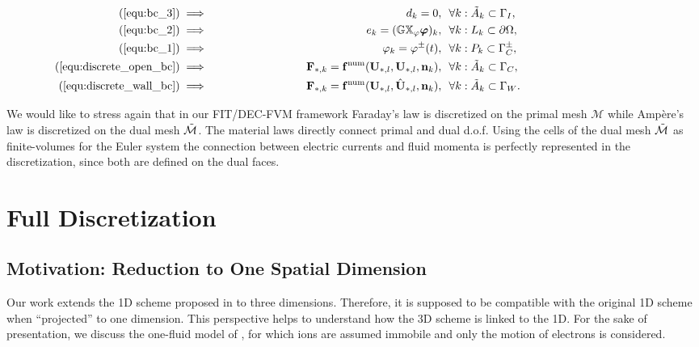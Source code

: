 \documentclass{article}
\begin{document}
\begin{subequations}
    \begin{align}
    (\ref{equ:bc_3}) & \implies \;\;\;\;\;\;\;\;\;\;\;\;\;\;\;\;\;\;\;\;\;\;\;\;\;\;\;\;& d_k = 0,\ \ &\forall k : \Tilde{A}_k \subset \Gamma_I,\;\;\;\;\;\;\;\;\;\;\;\;\;\;\;\;\;\;\;\;\;\;\;\;\;\;\;\;\;\;\;\;\;\;\;\;\;\;\;\;\;\;\;\;\\
    (\ref{equ:bc_2}) & \implies & e_k = (\mathbb{GX}_\varphi\bm{\varphi})_k,\ \ &\forall k : L_k \subset \partial\Omega, \\
    (\ref{equ:bc_1}) & \implies & \varphi_k = \varphi^\pm(t), \ \ &\forall k : P_k \subset \Gamma_C^\pm, \\ 
    (\ref{equ:discrete_open_bc}) & \implies & \mathbf{F}_{\ast,k} = \mathbf{f}^\text{num}(\mathbf{U}_{\ast,l}, \mathbf{U}_{\ast,l}, \mathbf{n}_k), \ \ &\forall k: \Tilde{A}_k \subset \Gamma_C, \\
    (\ref{equ:discrete_wall_bc}) & \implies & \mathbf{F}_{\ast,k} = \mathbf{f}^\text{num}(\mathbf{U}_{\ast,l}, \hat{\mathbf{U}}_{\ast,l}, \mathbf{n}_k), \ \ &\forall k: \Tilde{A}_k \subset \Gamma_W.
    \end{align}
\end{subequations}

We would like to stress again that in our FIT/DEC-FVM framework Faraday's law is
discretized on the primal mesh $\mathcal{M}$ while Amp\`{e}re's law is discretized on the
dual mesh $\Tilde{\mathcal{M}}$. The material laws directly connect primal and dual
d.o.f. Using the cells of the dual mesh $\Tilde{\mathcal{M}}$ as finite-volumes for the
Euler system the connection between electric currents and fluid momenta is perfectly
represented in the discretization, since both are defined on the dual faces.

\section{Full Discretization} \label{sec:full-discretization}
\subsection{Motivation: Reduction to One Spatial Dimension}

Our work extends the 1D scheme proposed in \cite{degond_2012} to three
dimensions. Therefore, it is supposed to be compatible with the original 1D scheme when
``projected'' to one dimension. This perspective helps to understand how the 3D scheme
is linked to the 1D. For the sake of presentation, we discuss the one-fluid model of
\cite{degond_2012}, for which ions are assumed immobile and only the motion of electrons is
considered.
\end{document}
